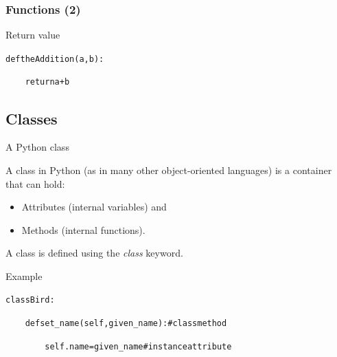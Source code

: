 \documentclass[xcolor=pdftex,dvipsnames,table,mathserif]{beamer}
\begin{document}
\begin{frame}
  \frametitle{Functions (2)}
  \begin{block}{Return value}

    \begin{alltt}
      def theAddition(a, b):

      ~~~~ return a + b
    \end{alltt}

  \end{block}
\end{frame}


\subsection{Classes}

\begin{frame}{A Python class}

  A class in Python (as in many other object-oriented languages) is a container that can hold:
  \begin{itemize}
  \item Attributes (internal variables) and
  \item Methods (internal functions).
  \end{itemize}

  A class is defined using the \emph{class} keyword.
  \begin{block}{Example}
    \begin{alltt}
      class Bird:

      ~~~~ def set\_name(self, given\_name):  \# class method

      ~~~~ ~~~~ self.name = given\_name  \# instance attribute
    \end{alltt}
  \end{block}

\end{frame}
\end{document}
